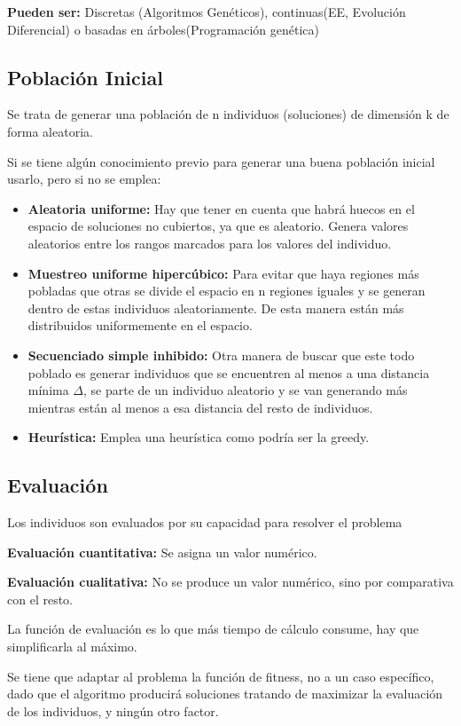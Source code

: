 \documentclass[12pt, twoside, openright]{report} %
\begin{document}
\textbf{Pueden ser:} Discretas (Algoritmos Genéticos), continuas(EE, Evolución Diferencial) o basadas en árboles(Programación genética)

\subsection{Población Inicial}
Se trata de generar una población de n individuos (soluciones) de dimensión k de forma aleatoria.

Si se tiene algún conocimiento previo para generar una buena población inicial usarlo, pero si no se emplea:
\begin{itemize}
	\item \textbf{Aleatoria uniforme:} Hay que tener en cuenta que habrá huecos en el espacio de soluciones no cubiertos, ya que es aleatorio. Genera valores aleatorios entre los rangos marcados para los valores del individuo.
	\item \textbf{Muestreo uniforme hipercúbico:} Para evitar que haya regiones más pobladas que otras se divide el espacio en n regiones iguales y se generan dentro de estas individuos aleatoriamente. De esta manera están más distribuidos uniformemente en el espacio.
	\item \textbf{Secuenciado simple inhibido:} Otra manera de buscar que este todo poblado es generar individuos que se encuentren al menos a una distancia mínima $\Delta$, se parte de un individuo aleatorio y se van generando más mientras están al menos a esa distancia del resto de individuos.
	\item \textbf{Heurística:} Emplea una heurística como podría ser la greedy.
\end{itemize}
\pagebreak

\subsection{Evaluación}
Los individuos son evaluados por su capacidad para resolver el problema

\textbf{Evaluación cuantitativa:} Se asigna un valor numérico.

\textbf{Evaluación cualitativa:} No se produce un valor numérico, sino por comparativa con el resto.

La función de evaluación es lo que más tiempo de cálculo consume, hay que simplificarla al máximo.

Se tiene que adaptar al problema la función de fitness, no a un caso específico, dado que el algoritmo producirá soluciones tratando de maximizar la evaluación de los individuos, y ningún otro factor.
\end{document}
